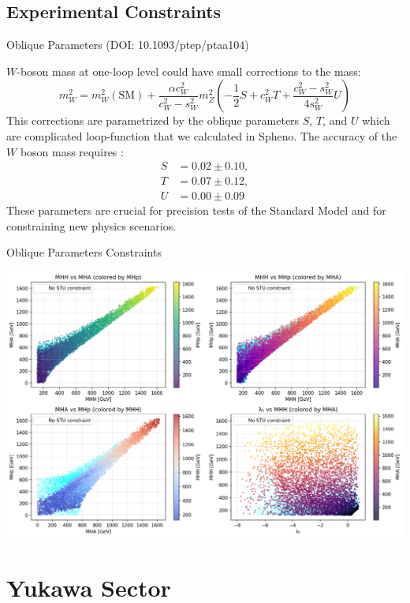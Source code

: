 \documentclass{../bredelebeamer}
\begin{document}
\subsection{Experimental Constraints}
\begin{frame}{Oblique Parameters (DOI:  10.1093/ptep/ptaa104)}

  $W$-boson mass at one-loop level could have small corrections to the mass:
  $$
  m_W^2=m_W^2(\mathrm{SM})+\frac{\alpha c_W^2}{c_W^2-s_W^2} m_Z^2\left(-\frac{1}{2} S+c_W^2 T+\frac{c_W^2-s_W^2}{4 s_W^2} U\right)
  $$
  This corrections are parametrized by the oblique parameters $S$, $T$, and $U$ which are complicated loop-function that we calculated in Spheno.
  \vfill
  The accuracy of the $W$ boson mass requires :
    \begin{align}
      S & = 0.02 \pm 0.10, \\
      T & = 0.07 \pm 0.12, \\
      U & = 0.00 \pm 0.09
    \end{align}
  These parameters are crucial for precision tests of the Standard Model and for constraining new physics scenarios.
\end{frame}

\begin{frame}{Oblique Parameters Constraints}
  \begin{center}
    \includegraphics[width=\textwidth]{stu_THDM_param_scan_analysis}
  \end{center}
\end{frame}


\section{Yukawa Sector}
\end{document}
